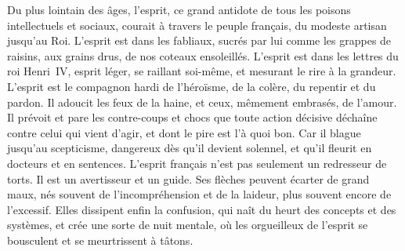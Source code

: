\documentclass[french,twoside]{book} %
\begin{document}
Du plus lointain des âges, l’esprit, ce grand antidote de tous les poisons intellectuels et sociaux, courait à travers le peuple français, du modeste artisan jusqu’au Roi. L’esprit est dans les fabliaux, sucrés par lui comme les grappes de raisins, aux grains drus, de nos coteaux ensoleillés. L’esprit est dans les lettres du roi Henri IV, esprit léger, se raillant soi-même, et mesurant le rire à la grandeur. L’esprit est le compagnon hardi de l’héroïsme, de la colère, du repentir et du pardon. Il adoucit les feux de la haine, et ceux, mêmement embrasés, de l’amour. Il prévoit et pare les contre-coups et chocs que toute action décisive déchaîne contre celui qui vient d’agir, et dont le pire est l’à quoi bon. Car il blague jusqu’au scepticisme, dangereux dès qu’il devient solennel, et qu’il fleurit en docteurs et en sentences. L’esprit français n’est pas seulement un redresseur de torts. Il est un avertisseur et un guide. Ses flèches peuvent écarter de grand maux, nés souvent de l’incompréhension et de la laideur, plus souvent encore de l’excessif. Elles dissipent enfin la confusion, qui naît du heurt des concepts et des systèmes, et crée une sorte de nuit mentale, où les orgueilleux de l’esprit se bousculent et se meurtrissent à tâtons.\par
\end{document}
